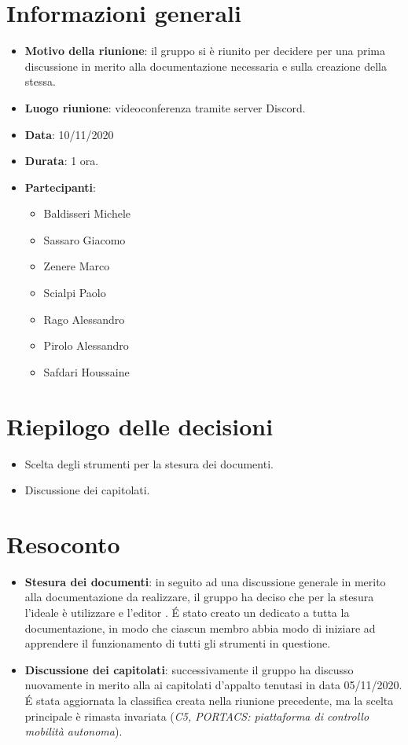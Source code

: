 \section{Informazioni generali}
\begin{itemize}
\item \textbf{Motivo della riunione}: il gruppo si è riunito per decidere per una prima discussione in merito alla documentazione necessaria e sulla creazione della stessa.
\item \textbf{Luogo riunione}: videoconferenza tramite server Discord.
\item \textbf{Data}: 10/11/2020
\item \textbf{Durata}: 1 ora.
\item \textbf{Partecipanti}:
	\begin{itemize}
	\item Baldisseri Michele
	\item Sassaro Giacomo
	\item Zenere Marco
	\item Scialpi Paolo
	\item Rago Alessandro
	\item Pirolo Alessandro
	\item Safdari Houssaine
	\end{itemize}
\end{itemize}
\section{Riepilogo delle decisioni}
\begin{itemize}
\item Scelta degli strumenti per la stesura dei documenti.
\item Discussione dei capitolati.
\end{itemize}
\section{Resoconto}
\begin{itemize}
\item \textbf{Stesura dei documenti}: in seguito ad una discussione generale in merito alla documentazione da realizzare, il gruppo ha deciso che per la stesura l'ideale è utilizzare  e l'editor . \'E stato creato un  dedicato a tutta la documentazione, in modo che ciascun membro abbia modo di iniziare ad apprendere il funzionamento di tutti gli strumenti in questione.

\item \textbf{Discussione dei capitolati}: successivamente il gruppo ha discusso nuovamente in merito alla ai capitolati d'appalto tenutasi in data 05/11/2020. \'E stata aggiornata la classifica creata nella riunione precedente, ma la scelta principale è rimasta invariata (\textit{C5, PORTACS: piattaforma di controllo mobilità autonoma}).
\end{itemize}